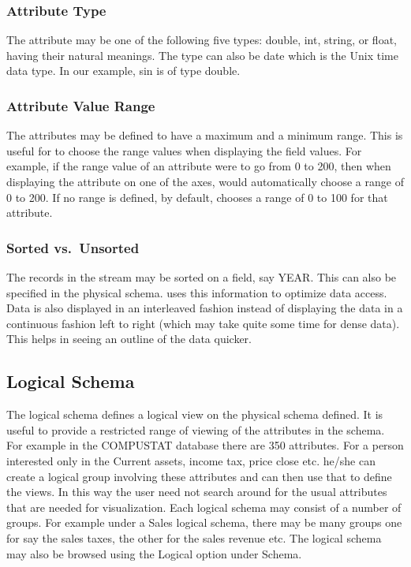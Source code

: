 \subsubsection{Attribute Type}

The attribute may be one of the following five types: double, int,
string, or float, having their natural meanings. The type can also be
date which is the Unix time data type. In our example, sin is of type
double.

\subsubsection{Attribute Value Range}

The attributes may be defined to have a maximum and a minimum
range. This is useful for \Devise to choose the range values when
displaying the field values. For example, if the range value of an
attribute were to go from 0 to 200, then when displaying the attribute
on one of the axes, \Devise would automatically choose a range of 0 to
200. If no range is defined, by default, \Devise chooses a range of 0
to 100 for that attribute.

\subsubsection{Sorted vs.\ Unsorted}

The records in the stream may be sorted on a field, say YEAR. This can
also be specified in the physical schema. \Devise uses this
information to optimize data access. Data is also displayed in an
interleaved fashion instead of displaying the data in a continuous
fashion left to right (which may take quite some time for dense
data). This helps in seeing an outline of the data quicker.

\subsection{Logical Schema}

The logical schema defines a logical view on the physical schema
defined. It is useful to provide a restricted range of viewing of the
attributes in the schema. For example in the COMPUSTAT database there
are 350 attributes. For a person interested only in the Current
assets, income tax, price close etc. he/she can create a logical group
involving these attributes and can then use that to define the
views. In this way the user need not search around for the usual
attributes that are needed for visualization. Each logical schema may
consist of a number of groups. For example under a Sales logical
schema, there may be many groups one for say the sales taxes, the
other for the sales revenue etc. The logical schema may also be
browsed using the Logical option under Schema.

